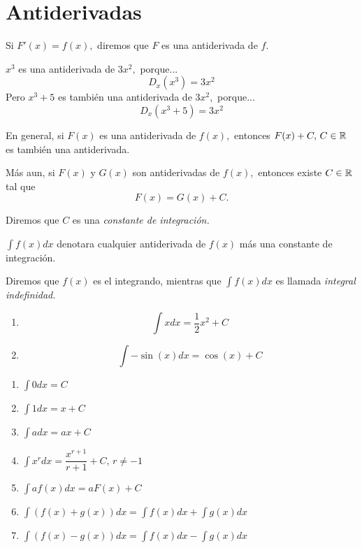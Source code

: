 \section{Antiderivadas}

 Si $F'(x)=f(x),$ diremos que $F$ es una antiderivada de $f.$

 \begin{resuelto}
  \label{soc:exmp:22.1}
  $x^{3}$ es una antiderivada de $3x^{2},$ porque...
  $$
  D_{x}\left( x^{3} \right)=3x^{2}
  $$
  Pero $x^{3}+5$ es también una antiderivada de $3x^{2},$ porque...
  $$
  D_{x}\left( x^{3} +5 \right)=3x^{2}
  $$
 \end{resuelto}



 En general, si $F(x)$ es una antiderivada de $f(x),$ entonces $F(x)+C, \, C\in \mathbb{R}$ es también una antiderivada.


 Más aun, si $F(x)$ y $G(x)$ son antiderivadas de $f(x),$ entonces existe $C\in \mathbb{R}$ tal que
 $$
 F(x)=G(x)+C.
 $$


 Diremos que $C$ es una \emph{constante de integraci\'on.}



 $\int f(x)dx$ denotara cualquier antiderivada de $f(x)$ más una constante de integraci\'on.


 Diremos que $f(x)$ es el integrando, mientras que $\int f(x)dx$ es llamada \emph{integral indefinidad.}



 \begin{resuelto}
 \label{soc:exmp:22.2}
  \begin{enumerate}
   \item $$\int xdx= \dfrac{1}{2}x^{2}+C$$

   \item $$\int -\sin(x)dx=  \cos(x)+C$$
  \end{enumerate}

 \end{resuelto}




 \begin{proposicion}
  \begin{enumerate}
  \label{antiderivatives}
   \item $\int 0 dx=C$

   \item $\int 1 dx=x+C$

   \item $\int adx=ax+C$

   \item $\int x^{r}dx=\dfrac{x^{r+1}}{r+1}+C, \, r\neq-1$

   \item $\int af(x)dx=aF(x)+C$

   \item $\int \left( f(x)+g(x) \right)dx=\int f(x)dx+\int g(x)dx$

   \item $\int \left( f(x)-g(x) \right)dx=\int f(x)dx-\int g(x)dx$
  \end{enumerate}

 \end{proposicion}




